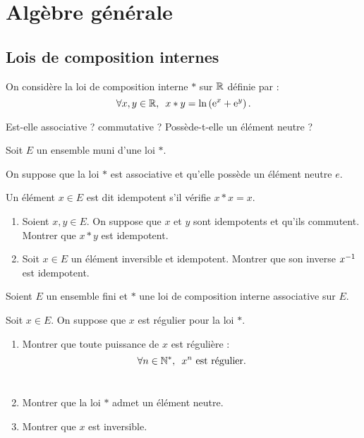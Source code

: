 \chapter{Algèbre générale}

\minitoc

\section{Lois de composition internes}

\begin{exo}
On considère la loi de composition interne \(*\) sur \(\mathbb{R}\) définie par : \[\quantifs{\forall x,y\in\R}x*y=\ln\paren{\e{x}+\e{y}}.\]

Est-elle associative ? commutative ? Possède-t-elle un élément neutre ?
\end{exo}

\begin{corr}
\end{corr}

\begin{exo}
Soit \(E\) un ensemble muni d'une loi \(*\).

On suppose que la loi \(*\) est associative et qu'elle possède un élément neutre \(e\).

Un élément \(x\in E\) est dit idempotent s'il vérifie \(x*x=x\).

\begin{enumerate}
\item Soient \(x,y\in E\). On suppose que \(x\) et \(y\) sont idempotents et qu'ils commutent. Montrer que \(x*y\) est idempotent. \\

\item Soit \(x\in E\) un élément inversible et idempotent. Montrer que son inverse \(x^{-1}\) est idempotent.
\end{enumerate}
\end{exo}

\begin{corr}
\end{corr}

\begin{exo}
Soient \(E\) un ensemble fini et \(*\) une loi de composition interne associative sur \(E\).

Soit \(x\in E\). On suppose que \(x\) est régulier pour la loi \(*\).

\begin{enumerate}
\item Montrer que toute puissance de \(x\) est régulière : \[\quantifs{\forall n\in\Ns}x^n\text{ est régulier}.\] \\

\item Montrer que la loi \(*\) admet un élément neutre. \\

\item Montrer que \(x\) est inversible.
\end{enumerate}
\end{exo}

